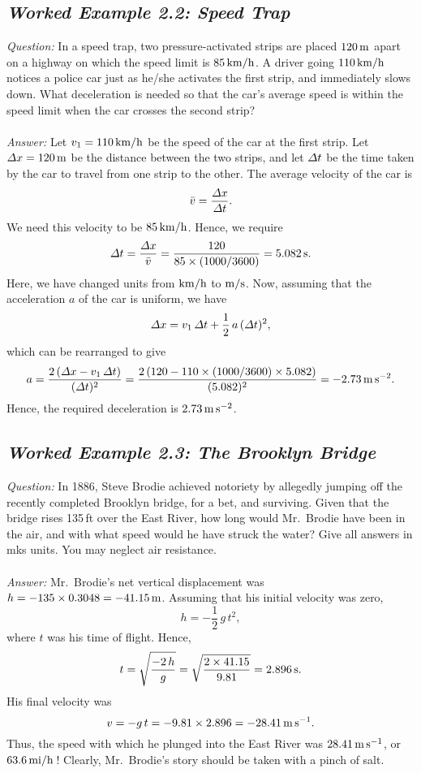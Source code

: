 \subsection*{\em Worked Example 2.2: Speed Trap}
{\em Question:} In a speed trap, two pressure-activated strips are placed $120\,{\rm m}$
apart on a highway on which the speed limit is $85\,{\rm km/h}$. A driver going $110\,{\rm km/h}$
notices a police car just as he/she  activates the first strip, and immediately slows down. What
deceleration is needed so that the car's average speed is within the speed limit
when the car crosses the second strip?\\
~\\
{\em Answer:} Let $v_1= 110\,{\rm km/h}$ be the speed of the car at the first strip.
 Let ${\mit\Delta} x = 120\,{\rm m}$ be the
distance between the two strips, and let ${\mit\Delta} t$ be the time taken by the
car to travel from one strip to the other. The average velocity of the car is
$$
\bar{v} = \frac{{\mit\Delta}x}{{\mit\Delta} t}.
$$
We need this velocity to be $85\,{\rm km/h}$. Hence, we require
$$
{\mit\Delta}t = \frac{{\mit\Delta}x}{\bar{v}} = \frac{120}{85\times (1000/3600)} = 5.082\,{\rm s}.
$$ 
Here, we have changed units from ${\rm km/h}$ to ${\rm m/s}$. Now,
assuming that the acceleration $a$ of the car is uniform, we have
$$
{\mit\Delta} x = v_1\,{\mit\Delta} t + \frac{1}{2}\,a\,({\mit\Delta t})^2,
$$
which can be rearranged to give
$$
a = \frac{2\,({\mit\Delta}x - v_1\,{\mit\Delta} t)}{({\mit\Delta}t)^2} =
\frac{ 2\,(120 - 110\times (1000/3600)\times 5.082)}{(5.082)^2} = -2.73\,
{\rm m\,s^{-2}}.
$$
Hence, the required deceleration is $2.73\,
{\rm m\,s^{-2}}$.

\subsection*{\em Worked Example 2.3: The Brooklyn Bridge}
{\em Question:} In 1886, Steve Brodie achieved notoriety by allegedly jumping off
the recently completed Brooklyn bridge, for a bet,  and surviving. Given
that the bridge rises 135\,ft over the East River, how long would Mr.~Brodie have
been in the air, and with what speed would he have struck the water? Give
all answers in mks units. You may neglect air resistance.\\
~\\
{\em Answer:} Mr.~Brodie's net vertical
displacement was $h = -135\times 0.3048 = -41.15\, {\rm m}$. 
Assuming that his initial velocity was zero, 
$$
h = -\frac{1}{2}\,g\,t^2,
$$
where $t$ was his time of flight. Hence,
$$
t = \sqrt{\frac{-2\,h}{g}} = \sqrt{\frac{2\times 41.15}{9.81}} = 2.896\,{\rm s}.
$$
His final velocity was
$$
v =- g\,t = -9.81\times 2.896 = -28.41\,{\rm m\,s}^{-1}.
$$
Thus, the speed with which he plunged into the East River was
$28.41\,{\rm m\,s}^{-1}$, or $63.6\,{\rm mi/h}$\,! Clearly,
Mr.~Brodie's story should be taken with a pinch of salt. 
